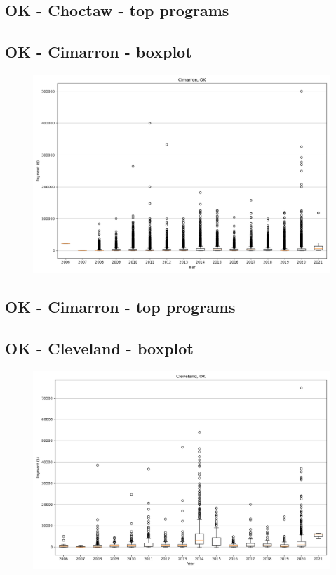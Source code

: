 \subsection*{OK - Choctaw - top programs}

\newpage
\subsection*{OK - Cimarron - boxplot}
\begin{figure}[h]
\centering
\includegraphics[width=7in]{../output/boxplots/counties/Cimarron-OK_boxplot.png}
\end{figure}


\subsection*{OK - Cimarron - top programs}

\newpage
\subsection*{OK - Cleveland - boxplot}
\begin{figure}[h]
\centering
\includegraphics[width=7in]{../output/boxplots/counties/Cleveland-OK_boxplot.png}
\end{figure}


